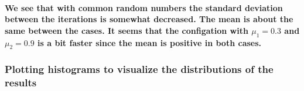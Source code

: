 \documentclass[11pt]{article}
\begin{document}
    \paragraph{\texorpdfstring{We see that with common random numbers the
standard deviation between the iterations is somewhat decreased. The
mean is about the same between the cases. It seems that the configation
with \(\mu_1 = 0.3\) and \(\mu_2 = 0.9\) is a bit faster since the mean
is positive in both
cases.}{We see that with common random numbers the standard deviation between the iterations is somewhat decreased. The mean is about the same between the cases. It seems that the configation with \textbackslash{}mu\_1 = 0.3 and \textbackslash{}mu\_2 = 0.9 is a bit faster since the mean is positive in both cases.}}\label{we-see-that-with-common-random-numbers-the-standard-deviation-between-the-iterations-is-somewhat-decreased.-the-mean-is-about-the-same-between-the-cases.-it-seems-that-the-configation-with-muux5f1-0.3-and-muux5f2-0.9-is-a-bit-faster-since-the-mean-is-positive-in-both-cases.}

    \subsubsection{Plotting histograms to visualize the distributions of the
results}\label{plotting-histograms-to-visualize-the-distributions-of-the-results}
\end{document}
